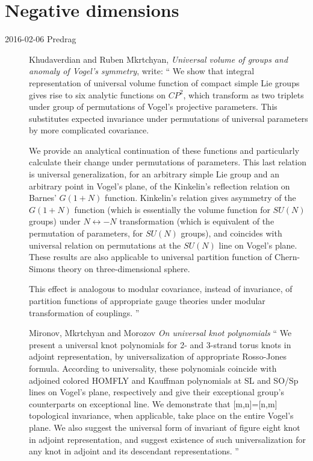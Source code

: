 

\chapter{Negative dimensions}
\label{c-negative}

\begin{description}

\item[2016-02-06  Predrag] Khudaverdian and Ruben Mkrtchyan,
{\em Universal volume of groups and anomaly of {Vogel}'s symmetry},
write: ``
We show that integral representation of universal
volume function of compact simple Lie groups gives rise to six analytic
functions on $CP^2$, which transform as two triplets under group of
permutations of Vogel's projective parameters.  This substitutes
expected invariance under permutations of universal parameters by more
complicated covariance.

 We provide an analytical continuation of these functions and particularly
calculate their change  under  permutations of parameters.  This last
relation is universal generalization, for an arbitrary simple Lie group
and an arbitrary point in Vogel's plane, of the Kinkelin's reflection
relation on Barnes' $G(1+N)$ function. Kinkelin's relation gives asymmetry
of the $G(1+N)$ function (which is essentially the volume function for $SU(N)$
groups)  under $N\leftrightarrow -N$ transformation (which is  equivalent
of the permutation of parameters, for $SU(N)$ groups), and coincides with
universal relation on permutations at the $SU(N)$ line on Vogel's plane.
These results are also applicable to universal partition function of
Chern-Simons theory on three-dimensional sphere.

This effect is  analogous to modular covariance, instead of invariance,
of partition functions of appropriate gauge theories under modular
transformation of couplings.
''

Mironov, Mkrtchyan and Morozov
{\em On universal knot polynomials}
``
We present a universal knot polynomials for 2- and 3-strand torus knots
in adjoint representation, by universalization of appropriate Rosso-Jones
formula. According to universality, these polynomials coincide with
adjoined colored HOMFLY and Kauffman polynomials at SL and SO/Sp lines on
Vogel's plane, respectively and give their exceptional group's
counterparts on exceptional line. We demonstrate that [m,n]=[n,m]
topological invariance, when applicable, take place on the entire Vogel's
plane. We also suggest the universal form of invariant of figure eight
knot in adjoint representation, and suggest existence of such
universalization for any knot in adjoint and its descendant
representations.
''


\end{description}
